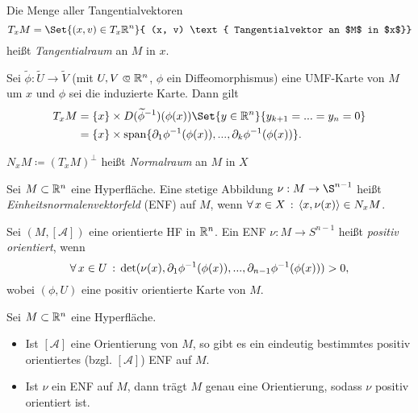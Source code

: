 \documentclass{cheat-sheet}
\newcommand{\Atlas}{\mathcal{A}} %
\theoremstyle{definition}
\newcommand{\scp}[2]{\langle #1 , #2 \rangle} %
\begin{document}
\begin{defn}
  Die Menge aller Tangentialvektoren
  \[ T_x M = \Set{ (x, v) \in T_x \R^n }{ (x, v) \text{ Tangentialvektor an $M$ in $x$}} \]
  heißt \emph{Tangentialraum} an $M$ in $x$.
\end{defn}

\begin{prop}
  Sei $\widetilde{\phi} : \widetilde{U} \to \widetilde{V}$ (mit $U, V \opn \R^n$, $\phi$ ein Diffeomorphismus) eine UMF-Karte von $M$ um $x$ und $\phi$ sei die induzierte Karte. Dann gilt
  \begin{align*}
    T_x M &= \{ x \} \times D (\widetilde{\phi}^{-1}) (\phi(x)) \Set{ y \in \R^n }{ y_{k+1} = ... = y_n = 0 } \\
    &= \{ x \} \times \mathrm{span} \{ \partial_1 \phi^{-1} (\phi(x)), ..., \partial_k \phi^{-1} (\phi(x)) \}.
  \end{align*}
\end{prop}


\begin{defn}
  $N_x M \coloneqq (T_x M)^\perp$ heißt \emph{Normalraum} an $M$ in $X$
\end{defn}



\begin{defn}
  Sei $M \subset \mathbb{R}^n$ eine Hyperfläche. Eine stetige Abbildung $\nu : M \to \S^{n {-} 1}$ heißt \emph{Einheitsnormalenvektorfeld} (ENF) auf $M$, wenn $\fa{x \in X} \scp{x}{\nu(x)} \in N_x M$.
\end{defn}

\begin{defn}
  Sei $(M, [\Atlas])$ eine orientierte HF in $\mathbb{R}^n$. Ein ENF $\nu : M \to S^{n {-} 1}$ heißt \emph{positiv orientiert}, wenn
  \[ \forall \, {x \in U} \,:\, \det(\nu(x), \partial_1 \phi^{-1}(\phi(x)), ..., \partial_{n {-} 1} \phi^{-1} (\phi(x))) > 0, \]
  wobei $(\phi, U)$ eine positiv orientierte Karte von $M$.
\end{defn}

\begin{satz}
  Sei $M \subset \mathbb{R}^n$ eine Hyperfläche.
  \begin{itemize}
    \item Ist $[\Atlas]$ eine Orientierung von $M$, so gibt es ein eindeutig bestimmtes positiv orientiertes (bzgl. $[\Atlas]$) ENF auf $M$.
    \item Ist $\nu$ ein ENF auf $M$, dann trägt $M$ genau eine Orientierung, sodass $\nu$ positiv orientiert ist.
  \end{itemize}
\end{satz}
\end{document}
